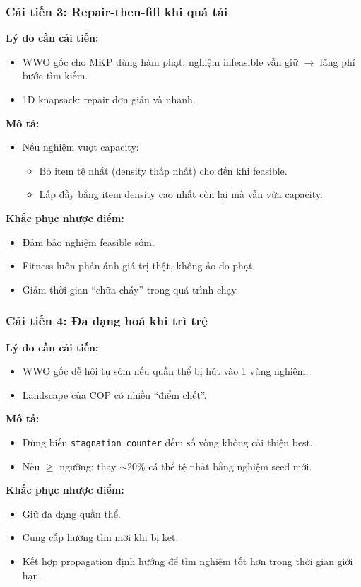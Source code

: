 \begin{frame}
    \frametitle{Cải tiến 3: Repair-then-fill khi quá tải}
    \textbf{Lý do cần cải tiến:}
    \begin{itemize}
        \item WWO gốc cho MKP dùng hàm phạt: nghiệm infeasible vẫn giữ $\rightarrow$ lãng phí bước tìm kiếm.
        \item 1D knapsack: repair đơn giản và nhanh.
    \end{itemize}
    \textbf{Mô tả:}
    \begin{itemize}
        \item Nếu nghiệm vượt capacity:
        \begin{itemize}
            \item Bỏ item tệ nhất (density thấp nhất) cho đến khi feasible.
            \item Lấp đầy bằng item density cao nhất còn lại mà vẫn vừa capacity.
        \end{itemize}
    \end{itemize}
    \textbf{Khắc phục nhược điểm:}
    \begin{itemize}
        \item Đảm bảo nghiệm feasible sớm.
        \item Fitness luôn phản ánh giá trị thật, không ảo do phạt.
        \item Giảm thời gian “chữa cháy” trong quá trình chạy.
    \end{itemize}
\end{frame}

\begin{frame}
    \frametitle{Cải tiến 4: Đa dạng hoá khi trì trệ}
    \textbf{Lý do cần cải tiến:}
    \begin{itemize}
        \item WWO gốc dễ hội tụ sớm nếu quần thể bị hút vào 1 vùng nghiệm.
        \item Landscape của COP có nhiều “điểm chết”.
    \end{itemize}
    \textbf{Mô tả:}
    \begin{itemize}
        \item Dùng biến \texttt{stagnation\_counter} đếm số vòng không cải thiện best.
        \item Nếu $\ge$ ngưỡng: thay $\sim$20\% cá thể tệ nhất bằng nghiệm seed mới.
    \end{itemize}

    \textbf{Khắc phục nhược điểm:}
    \begin{itemize}
        \item Giữ đa dạng quần thể.
        \item Cung cấp hướng tìm mới khi bị kẹt.
        \item Kết hợp propagation định hướng để tìm nghiệm tốt hơn trong thời gian giới hạn.
    \end{itemize}
\end{frame}
